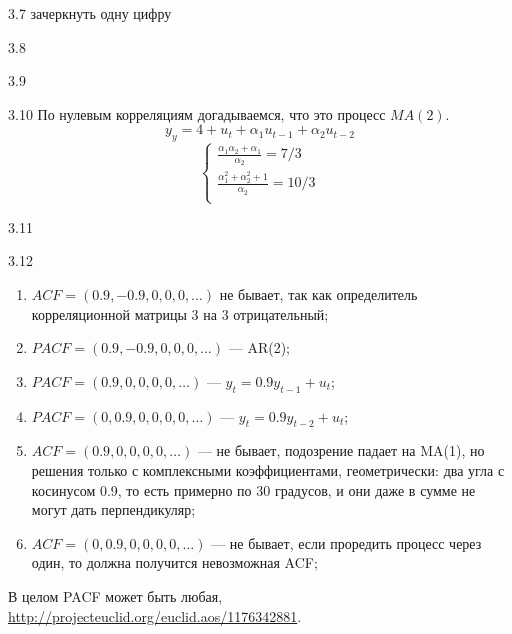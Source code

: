 \protect \hypertarget {soln:3.7}{}
\begin{solution}{{3.7}}
зачеркнуть одну цифру
\end{solution}
\protect \hypertarget {soln:3.8}{}
\begin{solution}{{3.8}}
\end{solution}
\protect \hypertarget {soln:3.9}{}
\begin{solution}{{3.9}}
\end{solution}
\protect \hypertarget {soln:3.10}{}
\begin{solution}{{3.10}}
По нулевым корреляциям догадываемся, что это процесс $MA(2)$.
\[
y_y = 4 + u_t + \alpha_1 u_{t-1} + \alpha_2 u_{t-2}
\]
\[
\begin{cases}
  \frac{\alpha_1 \alpha_2 + \alpha_1}{\alpha_2} = 7/3 \\
  \frac{\alpha_1^2 + \alpha_2^2 + 1}{\alpha_2} = 10/3 \\
\end{cases}
\]


\end{solution}
\protect \hypertarget {soln:3.11}{}
\begin{solution}{{3.11}}
\end{solution}
\protect \hypertarget {soln:3.12}{}
\begin{solution}{{3.12}}
  \begin{enumerate}
    \item $ACF = (0.9, -0.9, 0, 0, 0, \ldots)$ не бывает, так как определитель корреляционной матрицы 3 на 3 отрицательный;
    \item $PACF = (0.9, -0.9, 0, 0, 0, \ldots)$ — AR(2);
    \item $PACF = (0.9, 0, 0, 0, 0, \ldots)$ — $y_t = 0.9y_{t-1} + u_t$;
    \item $PACF = (0, 0.9, 0, 0, 0, 0, \ldots)$ — $y_t = 0.9y_{t-2} + u_t$;
    \item $ACF = (0.9, 0, 0, 0, 0, \ldots)$ — не бывает, подозрение падает на MA(1), но решения только с комплексными коэффициентами, геометрически: два угла с косинусом 0.9, то есть примерно по 30 градусов, и они даже в сумме не могут дать перпендикуляр;
    \item $ACF = (0, 0.9, 0, 0, 0, 0, \ldots)$ — не бывает, если проредить процесс через один, то должна получится невозможная ACF;
  \end{enumerate}
   В целом PACF может быть любая,
   \url{http://projecteuclid.org/euclid.aos/1176342881}.
\end{solution}
\protect \hypertarget {soln:3.13}{}
